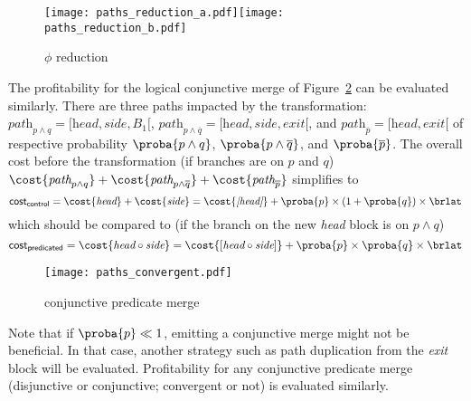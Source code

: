 \begin{figure}[h]
  \texttt{[image: paths\_reduction\_a.pdf]}\hspace{0.5cm}\texttt{[image: paths\_reduction\_b.pdf]}
  \caption{$\phi$ reduction\label{fig:paths_reduction}}
\end{figure}

The profitability for the logical conjunctive merge of Figure~\ref{fig:paths_convergent} can be evaluated similarly. 
There are three paths impacted by the transformation: 
$\textit{path}_{p\wedge q}=[\textit{head}, \textit{side}, B_1[$, $\textit{path}_{p\wedge \overline{q}}=[\textit{head}, \textit{side}, \textit{exit}[$, and $\textit{path}_{\overline{p}}=[\textit{head}, \textit{exit}[$ of respective probability $\proba{p\wedge q}$, $\proba{p\wedge \overline{q}}$, and $\proba{\overline{p}}$. 
The overall cost before the transformation (if branches are on $p$ and $q$) $\cost{\textit{path}_{p\wedge q}}+\cost{\textit{path}_{p\wedge \overline{q}}}+\cost{\textit{path}_{\overline{p}}}$ simplifies to
$$\textsf{cost}_{\textsf{control}}=\cost{\textit{head}}+\cost{\textit{side}}=\cost{\textit{[head]}}+\proba{p}\times (1+\proba{q})\times\brlat$$
which should be compared to (if the branch on the new \textit{head} block is on $p \wedge q$)
$$\textsf{cost}_{\textsf{predicated}}=\cost{\textit{head}\circ \textit{side}}=\cost{[\textit{head}\circ \textit{side}]}+\proba{p}\times\proba{q}\times \brlat$$
\begin{figure}[h]
  \texttt{[image: paths\_convergent.pdf]}
  \caption{conjunctive predicate merge\label{fig:paths_convergent}}
\end{figure}

Note that if $\proba{p}\ll 1$, emitting a conjunctive merge might not be beneficial. 
In that case, another strategy such as path duplication from the \textit{exit} block will be evaluated. 
Profitability for any conjunctive predicate merge (disjunctive or conjunctive; 
convergent or not) is evaluated similarly.

